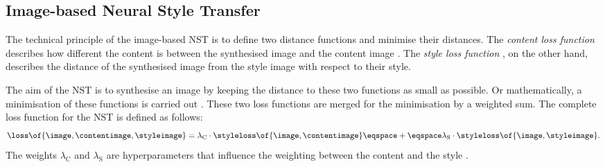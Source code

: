 \subsection{Image-based Neural Style Transfer}
The technical principle of the image-based \gls{NST} is to define two distance functions and minimise their distances. The \emph{content loss function} \contentloss{} describes how different the content is between the synthesised image \image{} and the content image \contentimage{}. The \emph{style loss function} \styleloss{}, on the other hand, describes the distance of the synthesised image \image{} from the style image \styleimage{} with respect to their style. 

The aim of the \gls{NST} is to synthesise an image by keeping the distance to these two functions as small as possible. Or mathematically, a minimisation of these functions is carried out \cite{Glas2021}. These two loss functions are merged for the minimisation by a weighted sum. The complete loss function \loss{} for the \gls{NST} is defined as follows:
\begin{equation*}
	\loss\of{\image\eqcommasep \contentimage\eqcommasep \styleimage} = \lambda_\text{C} \cdot \styleloss\of{\image\eqcommasep \contentimage} \eqspace+\eqspace \lambda_\text{S} \cdot \styleloss\of{\image\eqcommasep \styleimage} \eqtextdot
\end{equation*}
The weights $\lambda_\text{C}$ and $\lambda_\text{S}$ are hyperparameters that influence the weighting between the content and the style \cite{GEB2016}. 

